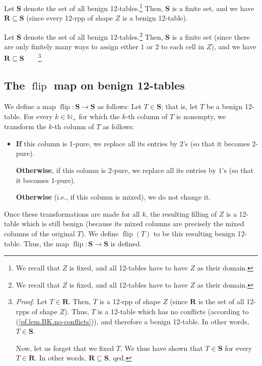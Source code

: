 \documentclass[numbers=enddot,12pt,final,onecolumn,notitlepage]{scrartcl}%
\theoremstyle{definition}
\newenvironment{verlong}{}{}
\newenvironment{vershort}{}{}
\begin{document}
\begin{vershort}
Let $\mathbf{S}$ denote the set of all benign 12-tables.\footnote{We recall
that $Z$ is fixed, and all 12-tables have to have $Z$ as their domain.} Then,
$\mathbf{S}$ is a finite set, and we have $\mathbf{R}\subseteq\mathbf{S}$
(since every 12-rpp of shape $Z$ is a benign 12-table).
\end{vershort}

\begin{verlong}
Let $\mathbf{S}$ denote the set of all benign 12-tables.\footnote{We recall
that $Z$ is fixed, and all 12-tables have to have $Z$ as their domain.} Then,
$\mathbf{S}$ is a finite set (since there are only finitely many ways to
assign either $1$ or $2$ to each cell in $Z$), and we have $\mathbf{R}%
\subseteq\mathbf{S}$\ \ \ \ \footnote{\textit{Proof.} Let $T\in\mathbf{R}$.
Then, $T$ is a 12-rpp of shape $Z$ (since $\mathbf{R}$ is the set of all
12-rpps of shape $Z$). Thus, $T$ is a 12-table which has no conflicts
(according to (\ref{pf.lem.BK.no-conflicts})), and therefore a benign
12-table. In other words, $T\in\mathbf{S}$.
\par
Now, let us forget that we fixed $T$. We thus have shown that $T\in\mathbf{S}$
for every $T\in\mathbf{R}$. In other words, $\mathbf{R}\subseteq\mathbf{S}$,
qed.}.
\end{verlong}

\subsection{The $\operatorname*{flip}$ map on benign 12-tables}

We define a map $\operatorname*{flip}:\mathbf{S}\rightarrow\mathbf{S}$ as
follows: Let $T\in\mathbf{S}$; that is, let $T$ be a benign 12-table. For
every $k\in\mathbb{N}_{+}$ for which the $k$-th column of $T$ is nonempty, we
transform the $k$-th column of $T$ as follows:

\begin{itemize}
\item \textbf{If} this column is 1-pure, we replace all its entries by $2$'s
(so that it becomes 2-pure).

\textbf{Otherwise}, if this column is 2-pure, we replace all its entries by
$1$'s (so that it becomes 1-pure).

\textbf{Otherwise} (i.e., if this column is mixed), we do not change it.
\end{itemize}

Once these transformations are made for all $k$, the resulting filling of $Z$
is a 12-table which is still benign (because its mixed columns are precisely
the mixed columns of the original $T$). We define $\operatorname*{flip}\left(
T\right)  $ to be this resulting benign 12-table. Thus, the map
$\operatorname*{flip}:\mathbf{S}\rightarrow\mathbf{S}$ is defined.
\end{document}
